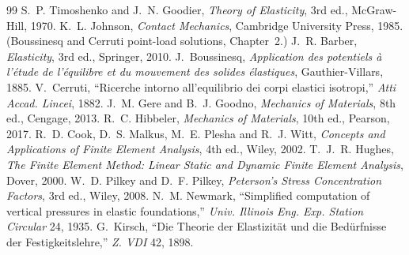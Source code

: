 \begin{thebibliography}{99}\small
{} S.~P. Timoshenko and J.~N. Goodier, \emph{Theory of Elasticity}, 3rd ed., McGraw-Hill, 1970.
 K.~L. Johnson, \emph{Contact Mechanics}, Cambridge University Press, 1985. (Boussinesq and Cerruti point-load solutions, Chapter~2.)
 J.~R. Barber, \emph{Elasticity}, 3rd ed., Springer, 2010.
 J.~Boussinesq, \emph{Application des potentiels \`a l'\'etude de l'\'equilibre et du mouvement des solides \'elastiques}, Gauthier-Villars, 1885.
 V.~Cerruti, ``Ricerche intorno all'equilibrio dei corpi elastici isotropi,'' \emph{Atti Accad. Lincei}, 1882.
 J.~M. Gere and B.~J. Goodno, \emph{Mechanics of Materials}, 8th ed., Cengage, 2013.
 R.~C. Hibbeler, \emph{Mechanics of Materials}, 10th ed., Pearson, 2017.
 R.~D. Cook, D.~S. Malkus, M.~E. Plesha and R.~J. Witt, \emph{Concepts and Applications of Finite Element Analysis}, 4th ed., Wiley, 2002.
 T.~J.~R. Hughes, \emph{The Finite Element Method: Linear Static and Dynamic Finite Element Analysis}, Dover, 2000.
 W.~D. Pilkey and D.~F. Pilkey, \emph{Peterson's Stress Concentration Factors}, 3rd ed., Wiley, 2008.
 N.~M. Newmark, ``Simplified computation of vertical pressures in elastic foundations,'' \emph{Univ. Illinois Eng. Exp. Station Circular} 24, 1935.
 G.~Kirsch, ``Die Theorie der Elastizit\"at und die Bed\"urfnisse der Festigkeitslehre,'' \emph{Z. VDI} 42, 1898.
\end{thebibliography}
